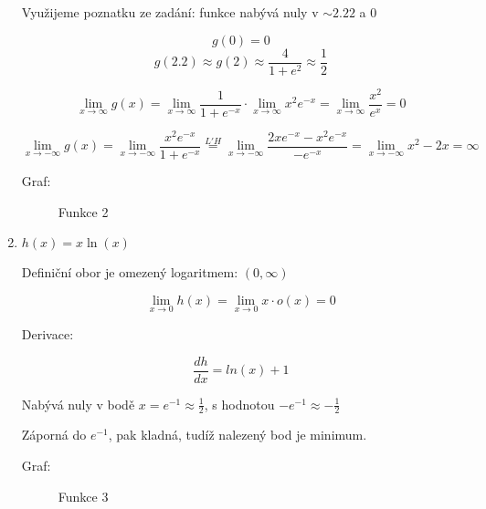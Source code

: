 \documentclass[10pt,a4paper]{article}
\theoremstyle{plain}
\theoremstyle{definition}
\begin{document}
\begin{enumerate}[label=(\alph*)	]
Využijeme poznatku ze zadání: funkce nabývá nuly v $\sim 2.22$ a $0$

\[  g(0) = 0 \]
\[  g(2.2) \approx g(2) \approx \frac4{1 + e^2} \approx \frac12 \]

\[ \lim_{x \to \infty } g(x) = \lim_{x \to \infty } \frac1{1+e^{-x}} \cdot \lim_{x \to \infty } x^2 e^{-x} = \lim_{x \to \infty } \frac{x^2}{e^x} = 0  \]

\[ \lim_{x \to -\infty } g(x) = \lim_{x \to -\infty } \frac{ x^2 e^{-x}}{1+e^{-x}} \overset{L'H}{=} \lim_{x \to -\infty } \frac{ 2x e^{-x} -x^2 e^{-x} }{-e^{-x}} =  \lim_{x \to -\infty } x^2 - 2x = \infty  \]


Graf:


\begin{figure}[h!]
  \begin{center}
    \caption{Funkce 2}
  \end{center}
\end{figure}

\item $h(x) = x \ln(x)$

Definiční obor je omezený logaritmem: $(0, \infty)$

\[\lim_{x \to 0} h(x) = \lim_{x \to 0} x \cdot o(x) = 0 \]

Derivace:

\[\frac{dh}{dx} = ln(x) + 1 \] 

Nabývá nuly v bodě $x = e^{-1} \approx \frac12$, s hodnotou $-e^{-1} \approx -\frac12$

Záporná do $e^{-1}$, pak kladná, tudíž nalezený bod je minimum.
	
Graf: 

\begin{figure}
  \begin{center}
    \caption{Funkce 3}
  \end{center}
\end{figure}

\end{enumerate}
\end{document}
